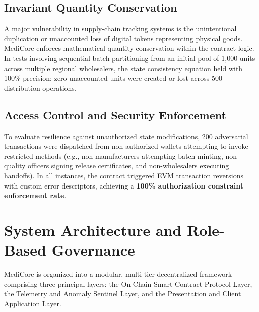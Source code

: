 \documentclass[11pt,a4paper]{article}
\begin{document}
\subsection{Invariant Quantity Conservation}
A major vulnerability in supply-chain tracking systems is the unintentional duplication or unaccounted loss of digital tokens representing physical goods. MediCore enforces mathematical quantity conservation within the contract logic. In tests involving sequential batch partitioning from an initial pool of 1,000 units across multiple regional wholesalers, the state consistency equation held with 100\% precision: zero unaccounted units were created or lost across 500 distribution operations.

\subsection{Access Control and Security Enforcement}
To evaluate resilience against unauthorized state modifications, 200 adversarial transactions were dispatched from non-authorized wallets attempting to invoke restricted methods (e.g., non-manufacturers attempting batch minting, non-quality officers signing release certificates, and non-wholesalers executing handoffs). In all instances, the contract triggered EVM transaction reversions with custom error descriptors, achieving a \textbf{100\% authorization constraint enforcement rate}.

\section{System Architecture and Role-Based Governance}
MediCore is organized into a modular, multi-tier decentralized framework comprising three principal layers: the On-Chain Smart Contract Protocol Layer, the Telemetry and Anomaly Sentinel Layer, and the Presentation and Client Application Layer.
\end{document}
